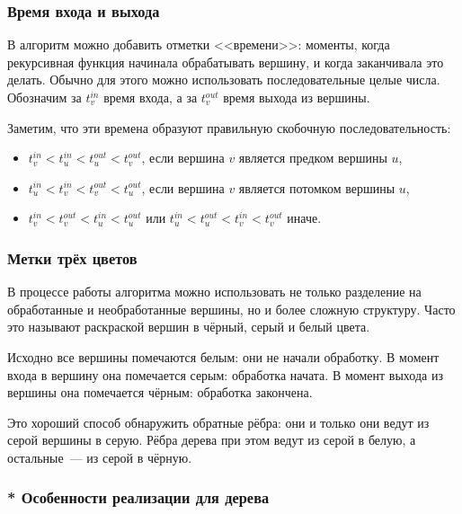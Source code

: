 \documentclass[a4paper,12pt]{article}
\begin{document}
      \subsubsection{Время входа и выхода}

      В алгоритм можно добавить отметки <<времени>>: моменты, когда
      рекурсивная функция начинала обрабатывать вершину, и когда
      заканчивала это делать. Обычно для этого можно использовать
      последовательные целые числа.
      Обозначим за $t^{in}_v$ время входа, а за
      $t^{out}_v$ время выхода из вершины.

      Заметим, что эти времена образуют правильную скобочную
      последовательность:
      \begin{itemize}
        \item $t^{in}_v < t^{in}_u < t^{out}_u < t^{out}_v$, если вершина
          $v$ является предком вершины $u$,
        \item $t^{in}_u < t^{in}_v < t^{out}_v < t^{out}_u$, если вершина
          $v$ является потомком вершины $u$,
        \item $t^{in}_v < t^{out}_v < t^{in}_u < t^{out}_u$ или
          $t^{in}_u < t^{out}_u < t^{in}_v < t^{out}_v$ иначе.
      \end{itemize}

      \subsubsection{Метки трёх цветов}

      В процессе работы алгоритма можно использовать не только разделение
      на обработанные и необработанные вершины, но и более сложную
      структуру. Часто это называют раскраской вершин в чёрный, серый и
      белый цвета.

      Исходно все вершины помечаются белым: они не начали обработку.
      В момент входа в вершину она помечается серым: обработка начата.
      В момент выхода из вершины она помечается чёрным: обработка
      закончена.

      Это хороший способ обнаружить обратные рёбра: они и только они
      ведут из серой вершины в серую. Рёбра дерева при этом ведут из
      серой в белую, а остальные~--- из серой в чёрную.

      \subsubsection{* Особенности реализации для дерева}
\end{document}
